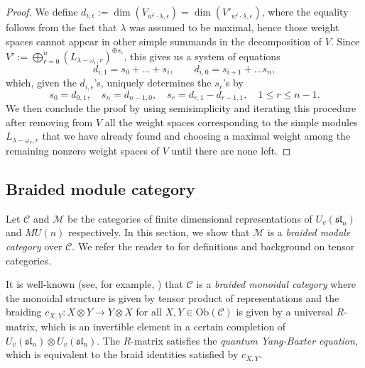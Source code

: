 \documentclass{amsart}
\numberwithin{equation}{section}
\theoremstyle{theorem}
\theoremstyle{definition}
\newcommand{\cc}{\mathcal{C}}
\newcommand{\mm}{\mathcal{M}}
\newcommand{\sll}{\mathfrak{sl}}
\newcommand{\uvsln}{U_v(\sll_n)}
\begin{document}
\begin{proof}
We define $d_{i,\epsilon}:=\dim(V_{w^i\cdot\lambda,\epsilon})=\dim(V'_{w^i\cdot\lambda,\epsilon})$, where the equality follows from the fact that $\lambda$ was assumed to be maximal, hence those weight spaces cannot appear in other simple summands in the decomposition of $V$. %
Since $V':=\bigoplus_{r=0}^n (L_{\lambda-\omega_r,r})^{\oplus s_r}$, this gives us a system of equations
$$d_{i,1}=s_0+\ldots+s_i,\qquad d_{i,0}=s_{i+1}+\ldots s_{n},$$
which, given the $d_{i,\epsilon}$'s, uniquely determines the $s_r$'s by
$$s_0=d_{0,1},\quad s_n=d_{n-1,0},\quad s_r=d_{r,1}-d_{r-1,1},\quad 1\leq r\leq n-1.$$
We then conclude the proof by using semisimplicity and iterating this procedure after removing from $V$ all the weight spaces corresponding to the simple modules $L_{\lambda-\omega_r,r}$ that we have already found and choosing a maximal weight among the remaining nonzero weight spaces of $V$ until there are none left.
\end{proof}

\subsection{Braided module category}

Let $\cc$ and $\mm$ be the categories of finite dimensional representations of $\uvsln$ and $MU(n)$ respectively. In this section, we show that $\mm$ is a \emph{braided module category} over $\cc$. We refer the reader to \cite{EGNO} for definitions and background on tensor categories.

It is well-known (see, for example, \cite[$\mathsection{8.3}$]{EGNO}) that $\cc$ is a \emph{braided monoidal category} where the monoidal structure is given by tensor product of representations and the braiding $c_{X,Y}:X\otimes Y\to Y\otimes X$ for all $X,Y\in \mathrm{Ob}(\cc)$ is given by a universal $R$-matrix, which is an invertible element in a certain completion of ${\uvsln\otimes \uvsln}$. The $R$-matrix satisfies the \emph{quantum Yang-Baxter equation}, which is equivalent to the braid identities satisfied by $c_{X,Y}$.
\end{document}
